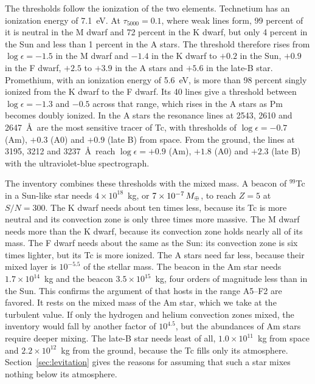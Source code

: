 \documentclass[final,5p]{elsarticle}
\begin{document}
The thresholds follow the ionization of the two elements. Technetium has an ionization energy of 7.1~eV. At $\tau_{5000} = 0.1$, where weak lines form, 99 percent of it is neutral in the M dwarf and 72 percent in the K dwarf, but only 4 percent in the Sun and less than 1 percent in the A stars. The  threshold therefore rises from $\log\epsilon = -1.5$ in the M dwarf and $-1.4$ in the K dwarf to $+0.2$ in the Sun, $+0.9$ in the F dwarf, $+2.5$ to $+3.9$ in the A stars and $+5.6$ in the late-B star. Promethium, with an ionization energy of 5.6~eV, is more than 98 percent singly ionized from the K dwarf to the F dwarf. Its 40  lines give a threshold between $\log\epsilon = -1.3$ and $-0.5$ across that range, which rises in the A stars as Pm becomes doubly ionized. In the A stars the  resonance lines at 2543, 2610 and 2647~\AA\ are the most sensitive tracer of Tc, with thresholds of $\log\epsilon = -0.7$ (Am), $+0.3$ (A0) and $+0.9$ (late B) from space. From the ground, the  lines at 3195, 3212 and 3237~\AA\ reach $\log\epsilon = +0.9$ (Am), $+1.8$ (A0) and $+2.3$ (late B) with the ultraviolet-blue spectrograph.

The inventory combines these thresholds with the mixed mass. A beacon of $^{99}$Tc in a Sun-like star needs $4\times10^{18}$~kg, or $7\times10^{-7}\,M_\oplus$, to reach $Z = 5$ at $S/N = 300$. The K dwarf needs about ten times less, because its Tc is more neutral and its convection zone is only three times more massive. The M dwarf needs more than the K dwarf, because its convection zone holds nearly all of its mass. The F dwarf needs about the same as the Sun: its convection zone is six times lighter, but its Tc is more ionized. The A stars need far less, because their mixed layer is $10^{-5.5}$ of the stellar mass. The  beacon in the Am star needs $1.7\times10^{14}$~kg and the  beacon $3.5\times10^{15}$~kg, four orders of magnitude less than in the Sun. This confirms the argument of \citet{Whitmire1980} that hosts in the range A5--F2 are favored. It rests on the mixed mass of the Am star, which we take at the turbulent value. If only the hydrogen and helium convection zones mixed, the inventory would fall by another factor of $10^{4.5}$, but the abundances of Am stars require deeper mixing. The late-B star needs least of all, $1.0\times10^{11}$~kg from space and $2.2\times10^{12}$~kg from the ground, because the Tc fills only its atmosphere. Section~\ref{sec:levitation} gives the reasons for assuming that such a star mixes nothing below its atmosphere.
\end{document}
